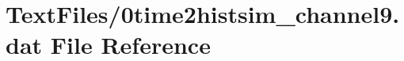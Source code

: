 \hypertarget{0time2histsim__channel9_8dat}{}\section{Text\+Files/0time2histsim\+\_\+channel9.dat File Reference}
\label{0time2histsim__channel9_8dat}
